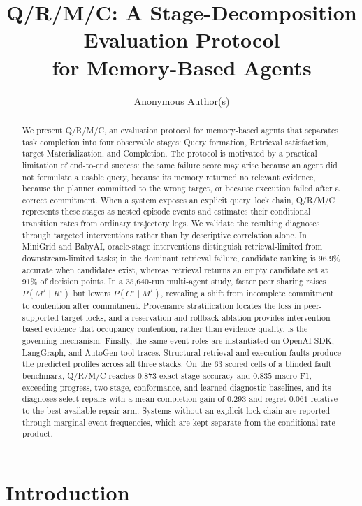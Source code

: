 \documentclass{article}
\title{Q/R/M/C: A Stage-Decomposition Evaluation Protocol\\for Memory-Based Agents}
\author{Anonymous Author(s)}
\begin{document}
\maketitle

\begin{abstract}
We present Q/R/M/C, an evaluation protocol for memory-based agents that separates task completion into four observable stages: Query formation, Retrieval satisfaction, target Materialization, and Completion. The protocol is motivated by a practical limitation of end-to-end success: the same failure score may arise because an agent did not formulate a usable query, because its memory returned no relevant evidence, because the planner committed to the wrong target, or because execution failed after a correct commitment. When a system exposes an explicit query--lock chain, Q/R/M/C represents these stages as nested episode events and estimates their conditional transition rates from ordinary trajectory logs. We validate the resulting diagnoses through targeted interventions rather than by descriptive correlation alone. In MiniGrid and BabyAI, oracle-stage interventions distinguish retrieval-limited from downstream-limited tasks; in the dominant retrieval failure, candidate ranking is $96.9\%$ accurate when candidates exist, whereas retrieval returns an empty candidate set at $91\%$ of decision points. In a 35{,}640-run multi-agent study, faster peer sharing raises $P(M^\star\mid R^\star)$ but lowers $P(C^\star\mid M^\star)$, revealing a shift from incomplete commitment to contention after commitment. Provenance stratification locates the loss in peer-supported target locks, and a reservation-and-rollback ablation provides intervention-based evidence that occupancy contention, rather than evidence quality, is the governing mechanism. Finally, the same event roles are instantiated on OpenAI SDK, LangGraph, and AutoGen tool traces. Structural retrieval and execution faults produce the predicted profiles across all three stacks. On the 63 scored cells of a blinded fault benchmark, Q/R/M/C reaches $0.873$ exact-stage accuracy and $0.835$ macro-F1, exceeding progress, two-stage, conformance, and learned diagnostic baselines, and its diagnoses select repairs with a mean completion gain of $0.293$ and regret $0.061$ relative to the best available repair arm. Systems without an explicit lock chain are reported through marginal event frequencies, which are kept separate from the conditional-rate product.
\end{abstract}

\section{Introduction}
\end{document}
